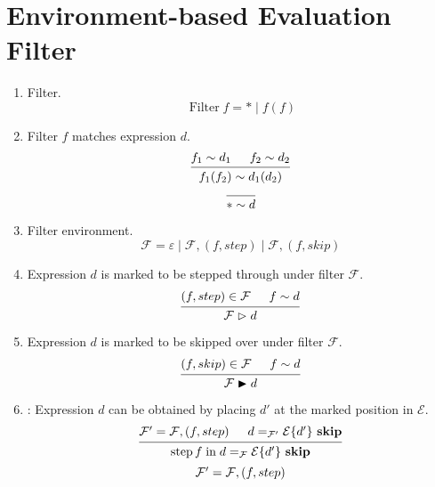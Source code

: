 \documentclass{article}
\newcommand{\matches}{\mathrel{\mathop{\sim}}}
\newcommand{\steps}{\mathrel{\mathop{\vartriangleright}}}
\newcommand{\skips}{\mathrel{\mathop{\blacktriangleright}}}
\newcommand{\iskip}{~\mathbf{skip}}
\DeclareMathOperator{\Filter}{Filter}
\DeclareMathOperator{\fstep}{step}
\newcommand{\fin}{\mathrel{\mathop{\text{in}}}}
\begin{document}
\section{Environment-based Evaluation Filter}

\begin{enumerate}
  \item {} Filter.
    \[
      \Filter f = \ast \mid f(f)
    \]
  \item \fbox{\(f \matches d\)} Filter \(f\) matches expression \(d\).
    \[
      \begin{prooftree}
        \hypo{f_1 \matches d_1}
        \hypo{f_2 \matches d_2}
        \infer2{f_1(f_2) \matches d_1(d_2)}
      \end{prooftree}
    \]
    \[
      \begin{prooftree}
        \infer0{\ast \matches d}
      \end{prooftree}
    \]
  \item {} Filter environment.
    \[
      \mathcal{F} = \varepsilon \mid \mathcal{F}, (f, step) \mid
      \mathcal{F}, (f, skip)
    \]
  \item \fbox{\(\mathcal{F} \steps d\)} Expression \(d\) is marked to be stepped
    through under filter \(\mathcal{F}\).
    \[
      \begin{prooftree}
        \hypo{(f, step) \in \mathcal{F}}
        \hypo{f \matches d}
        \infer2[]{\mathcal{F} \steps d}
      \end{prooftree}
    \]
  \item \fbox{\(\mathcal{F} \skips d\)} Expression \(d\) is marked to be
    skipped over under filter \(\mathcal{F}\).
    \[
      \begin{prooftree}
        \hypo{(f, skip) \in \mathcal{F}}
        \hypo{f \matches d}
        \infer2[]{\mathcal{F} \skips d}
      \end{prooftree}
    \]
  \item {}: Expression \(d\) can be
    obtained by placing \(d'\) at the marked position in
    \(\mathcal{E}\).
    \[
      \begin{prooftree}
        \hypo{\mathcal{F}' = \mathcal{F}, (f, step)}
        \hypo{d =_{\mathcal{F}'} \mathcal{E} \{ d' \} \iskip}
        \infer2{\fstep f \fin d =_\mathcal{F} \mathcal{E} \{ d' \} \iskip}
      \end{prooftree}
    \]
    \[
      \begin{prooftree}
        \hypo{\mathcal{F}' = \mathcal{F}, (f, step)}

\end{prooftree}\]
\end{enumerate}
\end{document}
